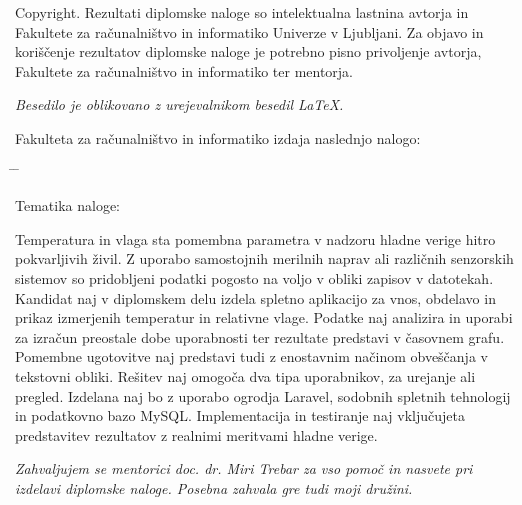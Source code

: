 \documentclass[a4paper, 12pt]{book}
\newcommand{\clearemptydoublepage}{\newpage{\pagestyle{empty}\cleardoublepage}}
\begin{document}
\noindent
{\sc Copyright}. 
Rezultati diplomske naloge so intelektualna lastnina avtorja in Fakultete za računalništvo in informatiko Univerze v Ljubljani.
Za objavo in koriščenje rezultatov diplomske naloge je potrebno pisno privoljenje avtorja, Fakultete za računalništvo in informatiko ter mentorja.

\begin{center}
\mbox{}\vfill
\emph{Besedilo je oblikovano z urejevalnikom besedil \LaTeX.}
\end{center}
\clearemptydoublepage

\thispagestyle{empty}
\vspace*{4cm}

\noindent
Fakulteta za računalništvo in informatiko izdaja naslednjo nalogo:
\medskip
\begin{tabbing}
\hspace{32mm}\= \hspace{6cm} \= \kill




Tematika naloge:
\end{tabbing}
Temperatura in vlaga sta pomembna parametra v nadzoru hladne verige hitro pokvarljivih živil. Z uporabo samostojnih merilnih naprav ali različnih senzorskih sistemov so pridobljeni podatki pogosto na voljo v obliki zapisov v datotekah. Kandidat naj v diplomskem delu izdela spletno aplikacijo za vnos, obdelavo in prikaz izmerjenih temperatur in relativne vlage. Podatke naj  analizira in uporabi za izračun preostale dobe uporabnosti ter rezultate predstavi v časovnem grafu. Pomembne ugotovitve naj predstavi tudi z enostavnim načinom obveščanja v tekstovni obliki. Rešitev naj omogoča dva tipa uporabnikov, za urejanje ali pregled. Izdelana naj bo z uporabo ogrodja Laravel, sodobnih spletnih tehnologij in podatkovno bazo MySQL. Implementacija in testiranje naj vključujeta predstavitev rezultatov z realnimi meritvami hladne verige. 
\vspace{15mm}






\vspace{2cm}

\clearemptydoublepage

\thispagestyle{empty}\mbox{}\vfill\null\it%
\noindent
Zahvaljujem se mentorici doc. dr. Miri Trebar za vso pomoč in nasvete pri izdelavi diplomske naloge. Posebna zahvala gre tudi moji družini.
\rm\normalfont
\end{document}
